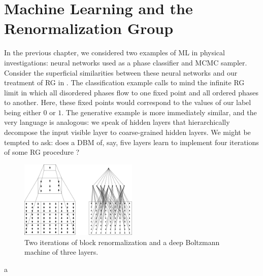 \chapter{Machine Learning and the Renormalization
  Group}\label{sec:comparison}
In the previous chapter, we considered two examples of ML in physical
investigations: neural networks used as a phase classifier and MCMC
sampler. Consider the superficial similarities between these neural
networks and our treatment of RG in . The
classification example calls to mind the infinite RG limit in which
all disordered phases flow to one fixed point and all ordered phases
to another. Here, these fixed points would correspond to the values of
our label being either $0$ or $1$. The generative example is more
immediately similar, and the very language is analogous: we speak of
hidden layers that hierarchically decompose the input visible layer to
coarse-grained hidden layers. We might be tempted to ask: does a DBM
of, say, five layers learn to implement four iterations of some RG
procedure ?

\begin{figure}[ht]
  \centering \includegraphics[width=0.5\textwidth]{figures/rg-rbm.png}
  \caption{Two iterations of block renormalization and a deep
    Boltzmann machine of three layers.\label{fig:rbm-rg} }
\end{figure}a


